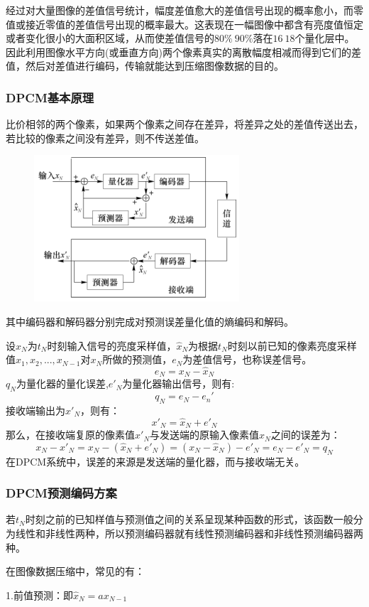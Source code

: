 \documentclass[11pt]{article}
\begin{document}
经过对大量图像的差值信号统计，幅度差值愈大的差值信号出现的概率愈小，而零值或接近零值的差值信号出现的概率最大。这表现在一幅图像中都含有亮度值恒定或者变化很小的大面积区域，从而使差值信号的$80\%~90\%$落在$16~18$个量化层中。因此利用图像水平方向(或垂直方向)两个像素真实的离散幅度相减而得到它们的差值，然后对差值进行编码，传输就能达到压缩图像数据的目的。

\subsubsection{DPCM基本原理}
比价相邻的两个像素，如果两个像素之间存在差异，将差异之处的差值传送出去，若比较的像素之间没有差异，则不传送差值。

\begin{figure}
	\centering
	\includegraphics[width=0.23\textheight]{43}
\end{figure}
其中编码器和解码器分别完成对预测误差量化值的熵编码和解码。

设$x_N$为$t_N$时刻输入信号的亮度采样值，$\hat{x}_N$为根据$t_N$时刻以前已知的像素亮度采样值$x_1,x_2,...,x_{N-1}$对$x_N$所做的预测值，$e_N$为差值信号，也称误差信号。
$$e_N = x_N - \hat{x}_N$$
$q_N$为量化器的量化误差,$e'_N$为量化器输出信号，则有:
$$q_N = e_N - e_n'$$
接收端输出为$x'_N$，则有：
$$x'_N = \hat{x}_N + e'_N$$
那么，在接收端复原的像素值$x'_N$与发送端的原输入像素值$x_N$之间的误差为：
$$x_N - x'_N = x_N - (\hat{x}_N + e'_N) = (x_N - \hat{x}_N) - e'_N = e_N - e'_N = q_N$$
在DPCM系统中，误差的来源是发送端的量化器，而与接收端无关。
\subsubsection{DPCM预测编码方案}
若$t_N$时刻之前的已知样值与预测值之间的关系呈现某种函数的形式，该函数一般分为线性和非线性两种，所以预测编码器就有线性预测编码器和非线性预测编码器两种。

在图像数据压缩中，常见的有：

1.前值预测：即$\hat{x}_N = ax_{N-1}$
\end{document}
